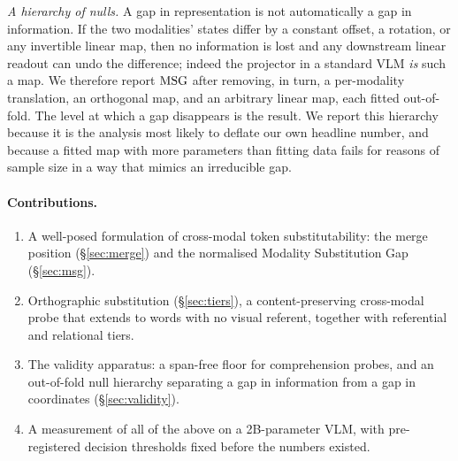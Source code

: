 \emph{A hierarchy of nulls.} A gap in representation is not automatically a gap
in information. If the two modalities' states differ by a constant offset, a
rotation, or any invertible linear map, then no information is lost and any
downstream linear readout can undo the difference; indeed the projector in a
standard VLM \emph{is} such a map. We therefore report $\mathrm{MSG}$ after removing, in
turn, a per-modality translation, an orthogonal map, and an arbitrary linear map,
each fitted out-of-fold. The level at which a gap disappears is the result. We
report this hierarchy because it is the analysis most likely to deflate our own
headline number, and because a fitted map with more parameters than fitting data
fails for reasons of sample size in a way that mimics an irreducible gap.

\paragraph{Contributions.}
\begin{enumerate}
    \item A well-posed formulation of cross-modal token substitutability: the
    merge position (\S\ref{sec:merge}) and the normalised Modality Substitution
    Gap (\S\ref{sec:msg}).
    \item Orthographic substitution (\S\ref{sec:tiers}), a content-preserving
    cross-modal probe that extends to words with no visual referent, together
    with referential and relational tiers.
    \item The validity apparatus: a span-free floor for comprehension probes,
    and an out-of-fold null hierarchy separating a gap in information from a gap
    in coordinates (\S\ref{sec:validity}).
    \item A measurement of all of the above on a 2B-parameter VLM, with
    pre-registered decision thresholds fixed before the numbers existed.
\end{enumerate}
